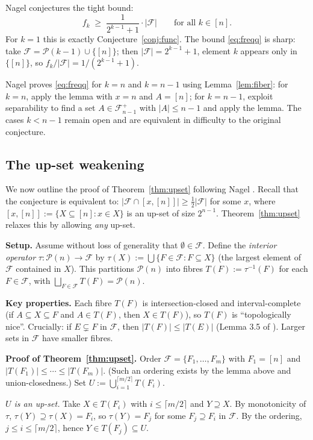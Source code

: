 \documentclass[11pt]{article}
\theoremstyle{definition}
\theoremstyle{remark}
\newcommand{\F}{\mathcal{F}}
\newcommand{\Pow}{\mathcal{P}}
\begin{document}
Nagel \cite{nagel2023} conjectures the tight bound:
\begin{equation}
  \label{eq:freqq}
  f_k \;\ge\; \frac{1}{2^{k-1}+1}\cdot|\F| \qquad \text{for all } k \in [n].
\end{equation}
For $k=1$ this is exactly Conjecture~\ref{conj:func}.
The bound \eqref{eq:freqq} is sharp: take
$\F = \Pow(k-1) \cup \{[n]\}$; then $|\F| = 2^{k-1}+1$, element $k$ appears
only in $\{[n]\}$, so $f_k/|\F| = 1/(2^{k-1}+1)$.

Nagel proves \eqref{eq:freqq} for $k = n$ and $k = n-1$ using
Lemma~\ref{lem:fiber}: for $k = n$, apply the lemma with $x = n$ and $A = [n]$;
for $k = n-1$, exploit separability to find a set $A \in \F^+_{n-1}$ with
$|A| \le n-1$ and apply the lemma.
The cases $k < n-1$ remain open and are equivalent in difficulty to
the original conjecture.

\subsection{The up-set weakening}

We now outline the proof of Theorem~\ref{thm:upset} following Nagel \cite{nagel2023}.
Recall that the conjecture is equivalent to: $|\F \cap [x,[n]]| \ge \frac{1}{2}|\F|$
for some $x$, where $[x,[n]] := \{X \subseteq [n] : x \in X\}$ is an up-set of size $2^{n-1}$.
Theorem~\ref{thm:upset} relaxes this by allowing \emph{any} up-set.

\textbf{Setup.}
Assume without loss of generality that $\emptyset \in \F$.
Define the \emph{interior operator} $\tau : \Pow(n) \to \F$ by
$\tau(X) := \bigcup\{F \in \F : F \subseteq X\}$
(the largest element of $\F$ contained in $X$).
This partitions $\Pow(n)$ into fibres $T(F) := \tau^{-1}(F)$ for each $F \in \F$,
with $\bigsqcup_{F \in \F} T(F) = \Pow(n)$.

\textbf{Key properties.}
Each fibre $T(F)$ is intersection-closed and interval-complete
(if $A \subseteq X \subseteq F$ and $A \in T(F)$, then $X \in T(F)$),
so $T(F)$ is ``topologically nice''.
Crucially: if $E \subsetneq F$ in $\F$, then $|T(F)| \le |T(E)|$ (Lemma 3.5 of \cite{nagel2023}).
Larger sets in $\F$ have smaller fibres.

\textbf{Proof of Theorem~\ref{thm:upset}.}
Order $\F = \{F_1, \ldots, F_m\}$ with $F_1 = [n]$ and $|T(F_1)| \le \cdots \le |T(F_m)|$.
(Such an ordering exists by the lemma above and union-closedness.)
Set $U := \bigcup_{i=1}^{\lceil m/2 \rceil} T(F_i)$.

\emph{$U$ is an up-set.}
Take $X \in T(F_i)$ with $i \le \lceil m/2 \rceil$ and $Y \supseteq X$.
By monotonicity of $\tau$, $\tau(Y) \supseteq \tau(X) = F_i$,
so $\tau(Y) = F_j$ for some $F_j \supseteq F_i$ in $\F$.
By the ordering, $j \le i \le \lceil m/2 \rceil$, hence $Y \in T(F_j) \subseteq U$.
\end{document}
